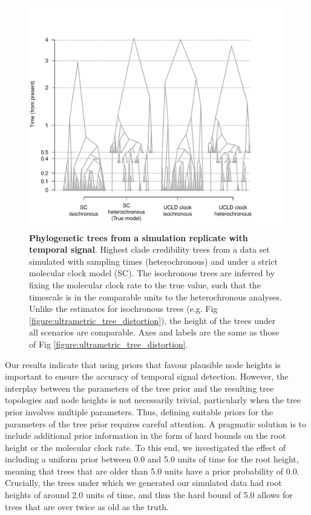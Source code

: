 \documentclass[10pt,letterpaper]{article}
\begin{document}
\begin{figure}[!h]
	\begin{center}
		\includegraphics[width=15cm]{sandbox_figures/tree_distortion_heterochronous.pdf}\newline
		\vspace{-0.5cm}
		\caption{\textbf{Phylogenetic trees from a simulation replicate with temporal signal}. Highest clade credibility trees from a data set simulated with sampling times (heterochronous) and under a strict molecular clock model (SC). The isochronous trees are inferred by fixing the molecular clock rate to the true value, such that the timescale is in the comparable units to the heterochronous analyses. Unlike the estimates for isochronous trees (e.g. Fig \ref{figure:ultrametric_tree_distortion}), the height of the trees  under all scenarios are comparable. Axes and labels are the same as those of Fig \ref{figure:ultrametric_tree_distortion}.}
		\label{figure:heterochronous_tree_distortion}
	\end{center}
\end{figure}

Our results indicate that using priors that favour plausible node heights is important to ensure the accuracy of temporal signal detection. However, the interplay between the parameters of the tree prior and the resulting tree topologies and node heights is not necessarily trivial, particularly when the tree prior involves multiple parameters. Thus, defining suitable priors for the parameters of the tree prior requires careful attention. A pragmatic solution is to include additional prior information in the form of hard bounds on the root height or the molecular clock rate. To this end, we investigated the effect of including a uniform prior between 0.0 and 5.0 units of time for the root height, meaning that trees that are older than 5.0 units have a prior probability of 0.0. Crucially, the trees under which we generated our simulated data had root heights of around 2.0 units of time, and thus the hard bound of 5.0 allows for trees that are over twice as old as the truth. 
\end{document}
